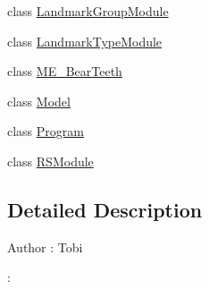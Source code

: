 \begin{DoxyCompactItemize}
\item 
class \hyperlink{class_real_sense_1_1_landmark_group_module}{Landmark\+Group\+Module}
\item 
class \hyperlink{class_real_sense_1_1_landmark_type_module}{Landmark\+Type\+Module}
\item 
class \hyperlink{class_real_sense_1_1_m_e___bear_teeth}{M\+E\+\_\+\+Bear\+Teeth}
\item 
class \hyperlink{class_real_sense_1_1_model}{Model}
\item 
class \hyperlink{class_real_sense_1_1_program}{Program}
\item 
class \hyperlink{class_real_sense_1_1_r_s_module}{R\+S\+Module}
\end{DoxyCompactItemize}


\subsection{Detailed Description}
\begin{DoxyAuthor}{Author}
\+: Tobi 

\+: 
\end{DoxyAuthor}
